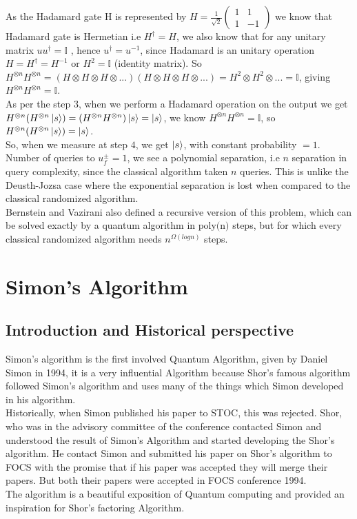 \documentclass[11.5pt, paper=a4]{article}
\theoremstyle{definition}
\numberwithin{theorem}{section}
\begin{document}
As the Hadamard gate H is represented by $H = \frac{1}{\sqrt{{2}}}
\begin{pmatrix}
1 & 1\\
1 & -1
\end{pmatrix}$ we know that Hadamard gate is Hermetian i.e $H^\dagger = H$, we also know that for any unitary matrix $uu^\dagger = \mathbb{I}$ , hence $u^\dagger = u^{-1}$, since Hadamard is an unitary operation $H= H^\dagger = H^{-1}$ or $H^2 = \mathbb{I}$ (identity matrix). So $H^{\otimes n} H^{\otimes n} =
 (H\otimes H\otimes H\otimes...)(H\otimes H\otimes H\otimes...) = H^2\otimes H^2\otimes... = \mathbb{I}$, giving $H^{\otimes n} H^{\otimes n} = \mathbb{I}$. \\[2mm]
As per the step $3$, when we perform a Hadamard operation on the output we get $H^{\otimes n}(H^{\otimes n}\ket{s}) = (H^{\otimes n} H^{\otimes n}) \ket{s} = \ket{s}$, we know $H^{\otimes n} H^{\otimes n} = \mathbb{I}$, so $H^{\otimes n}(H^{\otimes n}\ket{s}) = \ket{s}$.\\[2mm]
So, when we measure at step $4$, we get $\ket{s}$, with constant probability $=1$. Number of queries to $u_f^{\pm} = 1$, we see a polynomial separation, i.e $n$ separation in query complexity, since the classical algorithm taken $n$ queries. This is unlike the Deusth-Jozsa case where the exponential separation is lost when compared to the classical randomized algorithm.\\ [2 mm]
Bernstein and Vazirani also defined a recursive version of this problem, which can be solved exactly by a quantum algorithm in $\text{poly}($n$)$ steps, but for which every classical randomized algorithm needs $n^{\Omega (log n)}$ steps.
\section{Simon's Algorithm}
\subsection{Introduction and Historical perspective}
Simon's algorithm is the first involved Quantum Algorithm, given by Daniel Simon in 1994, it is a very influential Algorithm because Shor's famous algorithm followed Simon's algorithm and uses many of the things which Simon developed in his algorithm. \\[2mm]
Historically, when Simon published his paper to STOC, this was rejected. Shor, who was in the advisory committee of the conference contacted Simon and understood the result of Simon's Algorithm and started developing the Shor's algorithm. He contact Simon and submitted his paper on Shor's algorithm to FOCS with the promise that if his paper was accepted they will merge their papers. But both their papers were accepted in FOCS conference 1994. \\[2mm]
The algorithm is a beautiful exposition of Quantum computing and provided an inspiration for Shor's factoring Algorithm.
\end{document}
